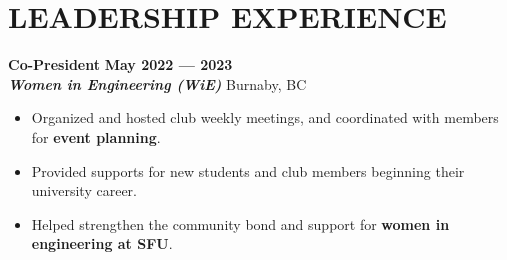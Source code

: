 \documentclass[letterpaper,11pt]{article}
\newcommand{\Item} [1] {
    \item\small{{#1 \vspace{-2pt}}}
}
\newcommand{\employer} [5] {
    {\textbf{#3} \hfill \textbf{#4 --- #5}\\ \textbf{\emph{#1}} \hfill #2\\}
}
\newcommand{\workItemListStart} [0] {
    \vspace{-1pt}
    \begin{itemize}[topsep=0pt,itemsep=-2pt]
}
\newcommand{\workItemListEnd} [0] {
    \end{itemize}
    \vspace{1pt}
}
\begin{document}
    \section{LEADERSHIP EXPERIENCE}
    \employer{Women in Engineering (WiE)}{Burnaby, BC}{Co-President}{May 2022}{2023}
    \workItemListStart{}
        \Item{Organized and hosted club weekly meetings, and coordinated with members for \textbf{event planning}.}
        \Item{Provided supports for new students and club members beginning their university career.}
        \Item{Helped strengthen the community bond and support for \textbf{women in engineering at SFU}.}

    \workItemListEnd{}
\end{document}
